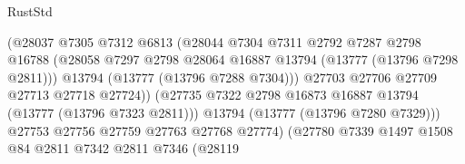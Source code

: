 \begin{lexlean}{RustStd}
\begin{coremodule}
                                          (@28037
                                            @7305
                                            @7312
                                            @6813
                                            (@28044
                                              @7304
                                              @7311
                                              @2792
                                              @7287
                                              @2798
                                              @16788
                                              (@28058
                                                @7297
                                                @2798
                                                @28064
                                                @16887
                                                @13794
                                                (@13777 (@13796 @7298 @2811)))
                                              @13794
                                              (@13777 (@13796 @7288 @7304)))
                                            @27703
                                            @27706
                                            @27709
                                            @27713
                                            @27718
                                            @27724))
                                        (@27735
                                          @7322
                                          @2798
                                          @16873
                                          @16887
                                          @13794
                                          (@13777 (@13796 @7323 @2811)))
                                        @13794
                                        (@13777 (@13796 @7280 @7329)))
                                      @27753
                                      @27756
                                      @27759
                                      @27763
                                      @27768
                                      @27774)
                                    (@27780
                                      @7339
                                      @1497
                                      @1508
                                      @84
                                      @2811
                                      @7342
                                      @2811
                                      @7346
                                      (@28119

\end{coremodule}
\end{lexlean}
